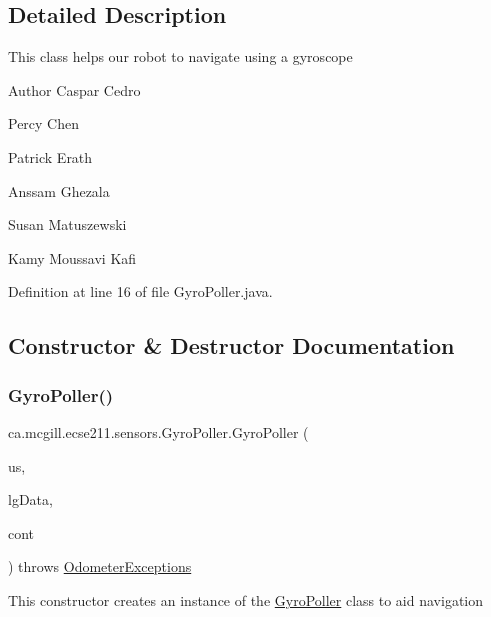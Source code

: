 \subsection{Detailed Description}
This class helps our robot to navigate using a gyroscope

\begin{DoxyAuthor}{Author}
Caspar Cedro 

Percy Chen 

Patrick Erath 

Anssam Ghezala 

Susan Matuszewski 

Kamy Moussavi Kafi 
\end{DoxyAuthor}


Definition at line 16 of file Gyro\+Poller.\+java.



\subsection{Constructor \& Destructor Documentation}
\mbox{\label{classca_1_1mcgill_1_1ecse211_1_1sensors_1_1_gyro_poller_a284eec4434708068ce9cb8a9635f7830}} 
\subsubsection{\texorpdfstring{Gyro\+Poller()}{GyroPoller()}}
{\footnotesize\ttfamily ca.\+mcgill.\+ecse211.\+sensors.\+Gyro\+Poller.\+Gyro\+Poller (\begin{DoxyParamCaption}\item[{Sample\+Provider}]{us,  }\item[{float \mbox{[}$\,$\mbox{]}}]{lg\+Data,  }\item[{\hyperlink{classca_1_1mcgill_1_1ecse211_1_1sensors_1_1_sensor_data}{Sensor\+Data}}]{cont }\end{DoxyParamCaption}) throws \hyperlink{classca_1_1mcgill_1_1ecse211_1_1odometer_1_1_odometer_exceptions}{Odometer\+Exceptions}}

This constructor creates an instance of the \hyperlink{classca_1_1mcgill_1_1ecse211_1_1sensors_1_1_gyro_poller}{Gyro\+Poller} class to aid navigation


